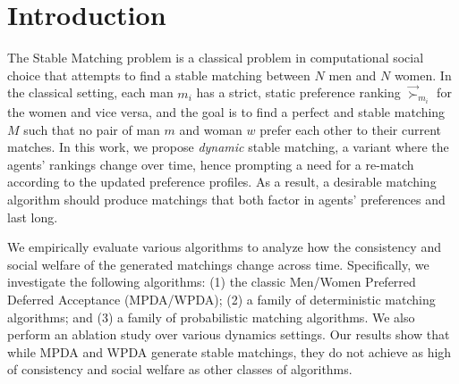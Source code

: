 \section{Introduction}
 
The Stable Matching problem is a classical problem in computational social choice that attempts to find a stable matching between $N$ men and $N$ women. In the classical setting, each man $m_i$ has a strict, static preference ranking $\overrightarrow{\succ}_{m_i}$ for the women and vice versa, and the goal is to find a perfect and stable matching $M$ such that no pair of man $m$ and woman $w$ prefer each other to their current matches. In this work, we propose \textit{dynamic} stable matching, a variant where the agents' rankings change over time, hence prompting a need for a re-match according to the updated preference profiles. As a result, a desirable matching algorithm should produce matchings that both factor in agents' preferences and last long.


We empirically evaluate various algorithms to analyze how the consistency and social welfare of the generated matchings change across time. Specifically, we investigate the following algorithms: (1) the classic Men/Women Preferred Deferred Acceptance (MPDA/WPDA); (2) a family of deterministic matching algorithms; and (3) a family of probabilistic matching algorithms. We also perform an ablation study over various dynamics settings. Our results show that while MPDA and WPDA generate stable matchings, they do not achieve as high of consistency and social welfare as other classes of algorithms.  